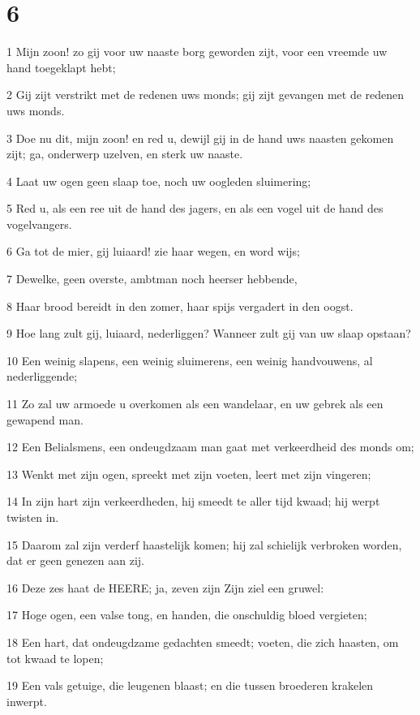 \chapter{6}

\par 1 Mijn zoon! zo gij voor uw naaste borg geworden zijt, voor een vreemde uw hand toegeklapt hebt;
\par 2 Gij zijt verstrikt met de redenen uws monds; gij zijt gevangen met de redenen uws monds.
\par 3 Doe nu dit, mijn zoon! en red u, dewijl gij in de hand uws naasten gekomen zijt; ga, onderwerp uzelven, en sterk uw naaste.
\par 4 Laat uw ogen geen slaap toe, noch uw oogleden sluimering;
\par 5 Red u, als een ree uit de hand des jagers, en als een vogel uit de hand des vogelvangers.
\par 6 Ga tot de mier, gij luiaard! zie haar wegen, en word wijs;
\par 7 Dewelke, geen overste, ambtman noch heerser hebbende,
\par 8 Haar brood bereidt in den zomer, haar spijs vergadert in den oogst.
\par 9 Hoe lang zult gij, luiaard, nederliggen? Wanneer zult gij van uw slaap opstaan?
\par 10 Een weinig slapens, een weinig sluimerens, een weinig handvouwens, al nederliggende;
\par 11 Zo zal uw armoede u overkomen als een wandelaar, en uw gebrek als een gewapend man.
\par 12 Een Belialsmens, een ondeugdzaam man gaat met verkeerdheid des monds om;
\par 13 Wenkt met zijn ogen, spreekt met zijn voeten, leert met zijn vingeren;
\par 14 In zijn hart zijn verkeerdheden, hij smeedt te aller tijd kwaad; hij werpt twisten in.
\par 15 Daarom zal zijn verderf haastelijk komen; hij zal schielijk verbroken worden, dat er geen genezen aan zij.
\par 16 Deze zes haat de HEERE; ja, zeven zijn Zijn ziel een gruwel:
\par 17 Hoge ogen, een valse tong, en handen, die onschuldig bloed vergieten;
\par 18 Een hart, dat ondeugdzame gedachten smeedt; voeten, die zich haasten, om tot kwaad te lopen;
\par 19 Een vals getuige, die leugenen blaast; en die tussen broederen krakelen inwerpt.
